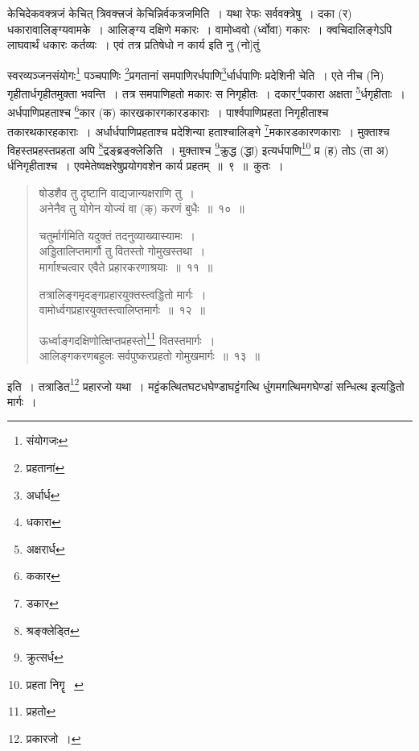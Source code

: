\documentclass[11pt, openany]{book}
\begin{document}
{\qt केचिदेकवक्त्रजं केचित् त्रिवक्त्त्रजं केचिन्निर्वकत्रजमिति~। यथा रेफः सर्ववक्त्रेषु~। दका (र) धकारावालिङ्ग्यवामके~। आलिङ्ग्य दक्षिणे मकारः~। वामोध्ववो (र्ध्वोवा) गकारः~। क्वचिदालिङ्गेऽपि लाघवार्थं धकारः कर्तव्यः~। एवं तत्र प्रतिषेधो न कार्य इति नु (नो]तुं}

\newpage
{}

\noindent
{\qt स्वरव्यञ्जनसंयोगः\renewcommand{\thefootnote}{1}\footnote{संयोगजः} पञ्चपाणिः \renewcommand{\thefootnote}{2}\footnote{प्रहतानां}प्रगतानां समपाणिरर्धपाणि\renewcommand{\thefootnote}{3}\footnote{अर्धार्ध}र्धार्धपाणिः प्रदेशिनी चेति~। एते नीच (नि) गृहीतार्धगृहीतमुक्ता भवन्ति~। तत्र समपाणिहतो मकारः स निगृहीतः~। दकार\renewcommand{\thefootnote}{4}\footnote{धकारा}पकारा अक्षता \renewcommand{\thefootnote}{5}\footnote{अक्षरार्ध}र्धगृहीताः~। अर्धपाणिप्रहताश्च \renewcommand{\thefootnote}{6}\footnote{ककार}कार (क) कारखकारगकारडकाराः~। पार्श्वपाणिप्रहता निगृहीताश्च तकारथकारहकाराः~। अर्धार्धपाणिप्रहताश्च प्रदेशिन्या हताश्चालिङ्गे \renewcommand{\thefootnote}{7}\footnote{डकार}मकारडकारणकाराः~। मुक्ताश्च विहस्तप्रहस्तप्रहता अपि \renewcommand{\thefootnote}{8}\footnote{श्रङ्क्लेड्ति}द्रङ्ब्रङ्क्लेङिति~। मुक्ताश्च \renewcommand{\thefootnote}{9}\footnote{क्रुत्सर्ध}क्रुद्ध (द्धा) इत्यर्धपाणि\renewcommand{\thefootnote}{10}\footnote{प्रहता निगॄ \textendash\ } प्र (ह) तोऽ (ता अ) र्धनिगृहीताश्च~। एवमेतेष्वक्षरेषुप्रयोगवशेन कार्य प्रहतम्~॥~९~॥~कुतः~।}

\begin{quote}
{\na  षोडशैव तु दृष्टानि वाद्यजान्यक्षराणि तु~।\\
 अनेनैव तु योगेन योज्यं वा (क्) करणं बुधैः~॥~१०~॥

 चतुर्मार्गमिति यदुक्तं तदनुव्याख्यास्यामः~।\\
 अड्डितालिप्तमार्गौ तु वितस्तो गोमुखस्तथा~।\\
 मार्गाश्चत्वार एवैते प्रहारकरणाश्रयाः~॥~११~॥

 तत्रालिङ्गमृदङ्गप्रहारयुक्तस्त्वड्डितो मार्गः~।\\
 वामोर्ध्वगप्रहारयुक्तस्त्वालिप्तमार्गः~॥~१२~॥

 ऊर्ध्वाङ्गदक्षिणोत्क्षिप्तप्रहस्तो\renewcommand{\thefootnote}{11}\footnote{प्रहतो} वितस्तमार्गः~।\\
 आलिङ्गकरणबहुलः सर्वपुष्करप्रहतो गोमुखमार्गः~॥~१३~॥}
\end{quote}

\noindent
{\qt इति~। तत्राडित\renewcommand{\thefootnote}{12}\footnote{प्रकारजो~।} प्रहारजो यथा~। मट्टंकत्थितघटधघेण्डाघट्टंगत्थि धुंगमगत्थिमगघेण्डां सन्धित्थ इत्यड्डितो मार्गः~।}\\
\end{document}
